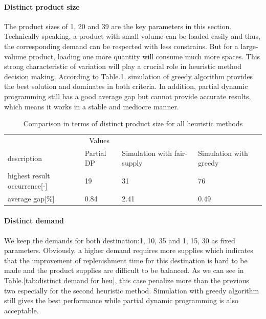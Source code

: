 \documentclass{article}
\begin{document}
\paragraph{Distinct product size}
The product sizes of 1, 20 and 39 are the key parameters in this section. Technically speaking, a product with small volume can be loaded easily and thus, the corresponding demand can be respected with less constrains. But for a large-volume product, loading one more quantity will consume much more spaces. This strong characteristic of variation will play a crucial role in heuristic method decision making. According to Table.\ref{tab:distinct product size for heu}, simulation of greedy algorithm provides the best solution and dominates in both criteria. In addition, partial dynamic programming still has a good average gap but cannot provide accurate results, which means it works in a stable and mediocre manner. 

\begin{table}[ht]
 \caption{Comparison in terms of distinct product size for all heuristic methods}
  \centering
  \begin{tabular}{llll}
    \toprule
    \multicolumn{3}{c}{Values}                   \\
    \cmidrule(r){2-3}
    description   & Partial DP    & Simulation with fair-supply      & Simulation with greedy \\
    \midrule
    highest result occurrence[-]	&	19 	&	31 	&	76	\\
    average gap[\%]	&	0.84	&	2.41 	&	0.49 	\\
    \bottomrule
  \end{tabular}
  \label{tab:distinct product size for heu}
\end{table}

\paragraph{Distinct demand}
We keep the demands for both destination:1, 10, 35 and 1, 15, 30 as fixed parameters. Obviously, a higher demand requires more supplies which indicates that the improvement of replenishment time for this destination is hard to be made and the product supplies are difficult to be balanced. As we can see in Table.\ref{tab:distinct demand for heu}, this case penalize more than the previous two especially for the second heuristic method. Simulation with greedy algorithm still gives the best performance while partial dynamic programming is also acceptable.
\end{document}
